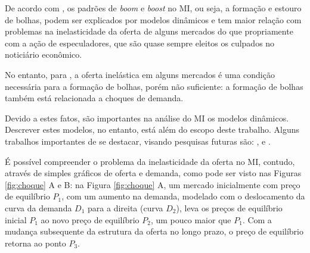 \documentclass[
	12pt,				%
	oneside,			%
	a4paper,			%
	chapter=TITLE,		%
	section=TITLE,		%
	english,			%
	brazil				%
	]{abntex2}
\begin{document}
De acordo com \textcite[p.~11]{regulation}, os padrões de \emph{boom} e \emph{boost} no \gls{MI},
ou seja, a formação e estouro de bolhas, podem ser explicados por modelos
dinâmicos e tem maior relação com problemas na inelasticidade da oferta de
alguns mercados do que propriamente com a ação de especuladores, que são quase
sempre eleitos os culpados no noticiário econômico.

No entanto, para \textcite[p.~1]{regulation}, a oferta inelástica em alguns mercados é
uma condição necessária para a formação de bolhas, porém não suficiente: a
formação de bolhas também está relacionada a choques de demanda.

Devido a estes fatos, são importantes na análise do \gls{MI} os modelos
dinâmicos. Descrever estes modelos, no entanto, está além do escopo deste
trabalho. Alguns trabalhos importantes de se destacar, visando pesquisas
futuras são: \textcite{wheaton1999}, \textcite{FAN201937} e \textcite{Malpezzi2002TheRO}.

É possível compreender o problema da inelasticidade da oferta no \gls{MI},
contudo, através de simples gráficos de oferta e demanda, como pode ser visto
nas Figuras \ref{fig:choque} A e B: na Figura \ref{fig:choque} A, um mercado
inicialmente com preço de equilíbrio \(P_1\), com um aumento na demanda, modelado
com o deslocamento da curva da demanda \(D_1\) para a direita (curva \(D_2\)), leva
os preços de equilíbrio inicial \(P_1\) ao novo preço de equilíbrio \(P_2\), um
pouco maior que \(P_1\). Com a mudança subsequente da estrutura da oferta no longo
prazo, o preço de equilíbrio retorna ao ponto \(P_3\).
\end{document}
